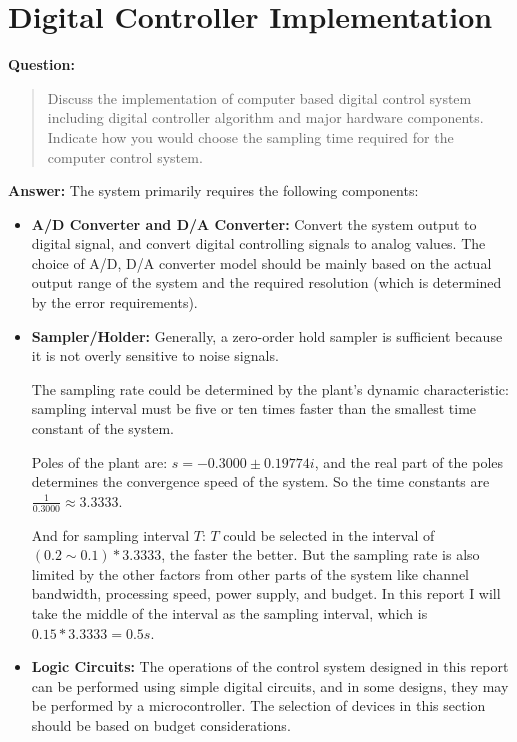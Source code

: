 \documentclass[12pt, oneside]{article}
\begin{document}
\section{Digital Controller Implementation}
\textbf{Question:}
\begin{quote}
    Discuss the implementation of computer based digital control system including digital controller algorithm and major hardware components. Indicate how you would choose the sampling time required for the computer control system.
\end{quote}
\textbf{Answer:}
The system primarily requires the following components:
\begin{itemize}
    \item \textbf{A/D Converter and D/A Converter:} Convert the system output to digital signal, and convert digital controlling signals to analog values. The choice of A/D, D/A converter model should be mainly based on the actual output range of the system and the required resolution (which is determined by the error requirements).
    \item \textbf{Sampler/Holder:} Generally, a zero-order hold sampler is sufficient because it is not overly sensitive to noise signals. 
    
    The sampling rate could be determined by the plant's dynamic characteristic: sampling interval must be five or ten times faster than the smallest time constant of the system.
    
    Poles of the plant are: $s=-0.3000\pm0.19774i$, and the real part of the poles determines the convergence speed of the system. So the time constants are $\frac{1}{0.3000}\approx3.3333$.

    And for sampling interval $T$: $T$ could be selected in the interval of $(0.2\sim0.1)*3.3333$, the faster the better. But the sampling rate is also limited by the other factors from other parts of the system like channel bandwidth, processing speed, power supply, and budget. In this report I will take the middle of the interval as the sampling interval, which is $0.15*3.3333 = 0.5 s$.
    
    \item \textbf{Logic Circuits:} The operations of the control system designed in this report can be performed using simple digital circuits, and in some designs, they may be performed by a microcontroller. The selection of devices in this section should be based on budget considerations.


\end{itemize}
\end{document}
